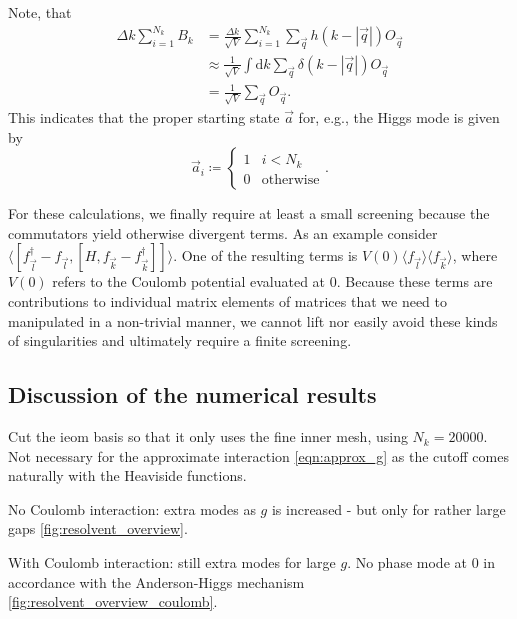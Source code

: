 \documentclass[
    reprint, 
    aps,
    preprintnumbers,
    twocolumn,
    prb,
    superscriptaddress
]{revtex4-2}
\newcommand{\expec}[1]{\langle #1 \rangle}
\begin{document}
\textbullet Note, that
\begin{subequations}
\begin{align}
    \Delta k \sum_{i=1}^{N_k} B_k &= \frac{\Delta k}{\sqrt{V}} \sum_{i=1}^{N_k} \sum_{\vec{q}} h(k - |\vec{q}|) O_{\vec{q}} \\
        &\approx \frac{1}{\sqrt{V}} \int \mathrm{d} k \sum_{\vec{q}} \delta(k - |\vec{q}|) O_{\vec{q}} \\
        &= \frac{1}{\sqrt{V}} \sum_{\vec{q}} O_{\vec{q}}.
\end{align}
\end{subequations}
This indicates that the proper starting state $\vec{a}$ for, e.g., the Higgs mode is given by
\begin{equation}
    \vec{a}_i \coloneqq \begin{cases}
        1 & i < N_k \\ 0 & \mathrm{otherwise}
    \end{cases}.
\end{equation}

\textbullet For these calculations, we finally require at least a small screening because the commutators yield otherwise divergent terms.
As an example consider 
$\expec{[ f_{\vec{l}}^\dagger  - f_{\vec{l}} , [H,  f_{\vec{k}} - f_{\vec{k}}^\dagger ]]}$.
One of the resulting terms is
$V( 0 )  \langle f_{ \vec{l} } \rangle \langle f_{ \vec{k} } \rangle$,
where $V(0)$ refers to the Coulomb potential evaluated at $0$.
Because these terms are contributions to individual matrix elements of matrices that we need to manipulated in a non-trivial manner,
we cannot lift nor easily avoid these kinds of singularities and ultimately require a finite screening.

\subsection{Discussion of the numerical results}

\textbullet Cut the ieom basis so that it only uses the fine inner mesh, using $N_k=20000$.
Not necessary for the approximate interaction \eqref{eqn:approx_g} as the cutoff comes naturally with the Heaviside functions.

\textbullet No Coulomb interaction: extra modes as $g$ is increased - but only for rather large gaps \autoref{fig:resolvent_overview}.

\textbullet With Coulomb interaction: still extra modes for large $g$. No phase mode at 0 in accordance with the Anderson-Higgs mechanism \autoref{fig:resolvent_overview_coulomb}.
\end{document}

